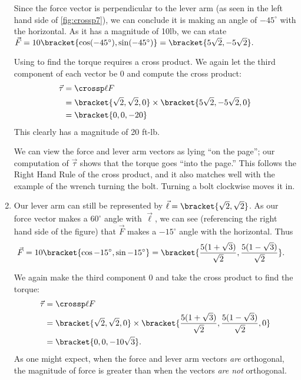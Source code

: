 \begin{example}
\begin{enumerate}
	Since the force vector is perpendicular to the lever arm (as seen in the left hand side of \autoref{fig:crossp7}), we can conclude it is making an angle of $-45^\circ$ with the horizontal. As it has a magnitude of 10lb, we can state $\vec F = 10\bracket{\cos (-45^\circ), \sin(-45^\circ)}= \bracket{5\sqrt2,-5\sqrt2}.$
	
	Using  to find the torque requires a cross product. We again let the third component of each vector be 0  and compute the cross product:
	\begin{align*}
	\vec\tau &= \crossp \ell F \\
				&= \bracket{\sqrt2,\sqrt2,0}\times \bracket{5\sqrt2,-5\sqrt2,0}\\
				&= \bracket{0,0,-20}
	\end{align*}
	This clearly has a magnitude of 20 ft-lb.
		
	We can view the force and lever arm vectors as lying ``on the page''; our computation of $\vec\tau$ shows that the torque goes ``into the page.'' This follows the Right Hand Rule of the cross product, and it also matches well with the example of the wrench turning the bolt. Turning a bolt clockwise moves it in.
	
	\item		Our lever arm can still be represented by $\vec \ell = \bracket{\sqrt2,\sqrt2}$. As our force vector makes a $60^\circ$ angle with $\vec \ell$, we can see (referencing the right hand side of the figure) that $\vec F$ makes a $-15^\circ$ angle with the horizontal. Thus 
	\begin{align*}
	\vec F = 10\bracket{\cos-15^\circ,\sin-15^\circ}&= \bracket{\frac{5(1+\sqrt3)}{\sqrt2},\frac{5(1-\sqrt3)}{\sqrt2}}
	.\end{align*}
	
	We again make the third component 0 and take the cross product to find the torque:
	\begin{align*}
	\vec\tau &= \crossp \ell F\\
	&= \bracket{\sqrt2,\sqrt2,0}\times  \bracket{\frac{5(1+\sqrt3)}{\sqrt2},\frac{5(1-\sqrt3)}{\sqrt2},0}\\
	&= \bracket{0,0,-10\sqrt3}
	.
	\end{align*}
	As one might expect, when the force and lever arm vectors \emph{are} orthogonal, the magnitude of force is greater than when the vectors \emph{are not} orthogonal.
\end{enumerate}
\end{example}


